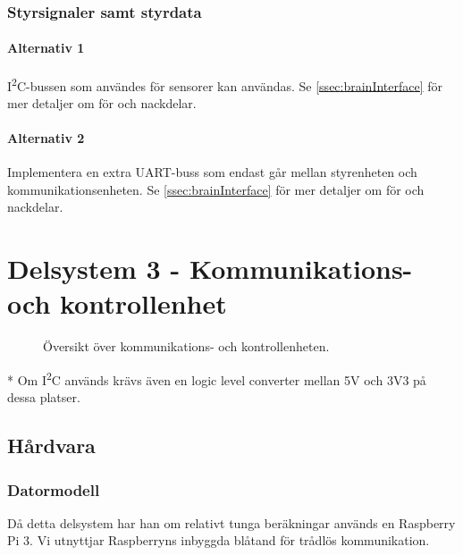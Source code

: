 \documentclass[a4paper,11pt]{article}
\begin{document}
\subsubsection{Styrsignaler samt styrdata}

\paragraph{Alternativ 1}
I\textsuperscript{2}C-bussen som användes för sensorer kan användas. Se \ref{ssec:brainInterface} för mer detaljer om för och nackdelar.

\paragraph{Alternativ 2}
Implementera en extra UART-buss som endast går mellan styrenheten och kommunikationsenheten. Se \ref{ssec:brainInterface} för mer detaljer om för och nackdelar.

\newpage
\section{Delsystem 3 - Kommunikations- och kontrollenhet}
\begin{figure}[h!]
    \caption{Översikt över kommunikations- och kontrollenheten.  }
    \label{fig:modules}
\end{figure}
\noindent \begin{small}
* Om I\textsuperscript{2}C används krävs även en logic level converter mellan 5V och 3V3 på dessa platser.
\end{small}


\subsection{Hårdvara}

\subsubsection{Datormodell}
Då detta delsystem har han om relativt tunga beräkningar används en Raspberry Pi 3. Vi utnyttjar Raspberryns inbyggda blåtand för trådlös kommunikation.
\end{document}
